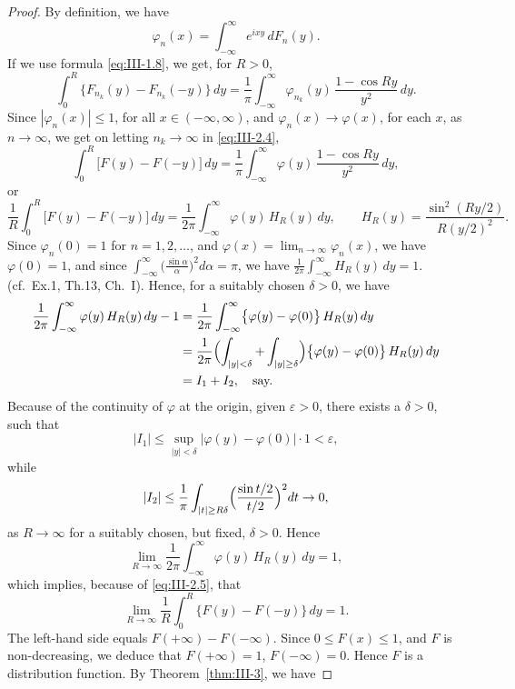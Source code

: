 \begin{proof}
By definition, we have
\[
\varphi_{n}(x)=\int_{-\infty}^{\infty}e^{ixy}\,dF_{n}(y).
\]
If we use formula \eqref{eq:III-1.8}, we get, for $R>0$,
\begin{equation}\tag{2.4}\label{eq:III-2.4}
\int_{0}^{R}\bigl\{F_{n_{k}}(y)-F_{n_{k}}(-y)\bigr\}\,dy
=\frac{1}{\pi}\int_{-\infty}^{\infty}\varphi_{n_{k}}(y)\,\frac{1-\cos Ry}{y^{2}}\,dy.
\end{equation}
Since $|\varphi_{n}(x)|\le1$, for all $x\in(-\infty,\infty)$, and $\varphi_{n}(x)\to\varphi(x)$, for each $x$, as $n\to\infty$, we get on letting $n_{k}\to\infty$ in \eqref{eq:III-2.4},
\[
\int_{0}^{R}\bigl[F(y)-F(-y)\bigr]\,dy=\frac{1}{\pi}\int_{-\infty}^{\infty}\varphi(y)\,\frac{1-\cos Ry}{y^{2}}\,dy,
\]
or
\begin{equation}\tag{2.5}\label{eq:III-2.5}
\frac{1}{R}\int_{0}^{R}\bigl[F(y)-F(-y)\bigr]\,dy
=\frac{1}{2\pi}\int_{-\infty}^{\infty}\varphi(y)\,H_{R}(y)\,dy,\qquad
H_{R}(y)=\frac{\sin^{2}(Ry/2)}{R(y/2)^{2}}.
\end{equation}
Since $\varphi_{n}(0)=1$ for $n=1,2,\dots$, and $\varphi(x)=\lim_{n\to\infty}\varphi_{n}(x)$, we have $\varphi(0)=1$, and since $\int_{-\infty}^{\infty}\bigl(\frac{\sin\alpha}{\alpha}\bigr)^{2}d\alpha=\pi$, we have $\frac{1}{2\pi}\int_{-\infty}^{\infty}H_{R}(y)\,dy=1$. (cf.\ Ex.1, Th.13, Ch.~I). Hence, for a suitably chosen $\delta>0$, we have
\begin{align*}
\frac{1}{2\pi}\int_{-\infty}^{\infty}\varphi(y)\,H_{R}(y)\,dy-1
&=\frac{1}{2\pi}\int_{-\infty}^{\infty}\bigl\{\varphi(y)-\varphi(0)\bigr\}\,H_{R}(y)\,dy\\
&=\frac{1}{2\pi}\Bigl(\int_{|y|<\delta}+\int_{|y|\ge\delta}\Bigr)\bigl\{\varphi(y)-\varphi(0)\bigr\}\,H_{R}(y)\,dy\\
&=I_{1}+I_{2},\quad\text{say.}
\end{align*}
Because of the continuity of $\varphi$ at the origin, given $\varepsilon>0$, there exists a $\delta>0$, such that
\[
|I_{1}|\le\sup_{|y|<\delta}\bigl|\varphi(y)-\varphi(0)\bigr|\cdot1<\varepsilon,
\]
while
\[
|I_{2}|\le\frac{1}{\pi}\int_{|t|\ge R\delta}\Bigl(\frac{\sin t/2}{t/2}\Bigr)^{2}dt\to0,
\]
as $R\to\infty$ for a suitably chosen, but fixed, $\delta>0$. Hence
\[
\lim_{R\to\infty}\frac{1}{2\pi}\int_{-\infty}^{\infty}\varphi(y)\,H_{R}(y)\,dy=1,
\]
which implies, because of \eqref{eq:III-2.5}, that
\begin{equation}\tag{2.6}\label{eq:III-2.6}
\lim_{R\to\infty}\frac{1}{R}\int_{0}^{R}\bigl\{F(y)-F(-y)\bigr\}\,dy=1.
\end{equation}
The left-hand side equals $F(+\infty)-F(-\infty)$. Since $0\le F(x)\le1$, and $F$ is non-decreasing, we deduce that $F(+\infty)=1$, $F(-\infty)=0$. Hence $F$ is a distribution function. By Theorem~\ref{thm:III-3}, we have

\end{proof}
